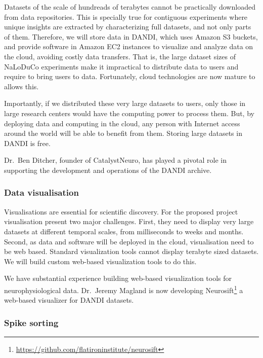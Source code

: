 Datasets of the scale of hundreads of terabytes cannot be practically
downloaded from data repositories. This is specially true for contiguous
experiments where unique insights are extracted by characterizing full
datasets, and not only parts of them.
%
Therefore, we will store data in DANDI, which uses Amazon S3 buckets, and
provide software in Amazon EC2 instances to visualize and analyze data on the
cloud, avoiding costly data transfers.
%
That is, the large dataset sizes of NaLoDuCo experiments make it impractical to
distribute data to users and require to bring users to data.
%
Fortunately, cloud technologies are now mature to allows this.

Importantly, if we distributed these very large datasets to users, only those
in large research centers would have the computing power to process them. But, by deploying data
and computing in the cloud, any person with Internet access around the world
will be able to benefit from them.
%
Storing large datasets in DANDI is free.

Dr.~Ben Ditcher, founder of CatalystNeuro, has played a pivotal role in
supporting the development and operations of the DANDI archive.

\subsubsection{Data visualisation}

Visualisations are essential for scientific discovery.
%
For the proposed project visualisation present two major challenges. First, they need
to display very large datasets at different temporal scales, from milliseconds
to weeks and months. Second, as data and software will be deployed in the
cloud, visualisation need to be web based.
%
Standard visualization tools cannot display terabyte sized datasets.
%
We will build custom web-based visualization tools to do this.

We have substantial experience building web-based visualization tools for
neurophysiological data. Dr.~Jeremy Magland is now developing
Neurosift\footnote{\url{https://github.com/flatironinstitute/neurosift}} a web-based
visualizer for DANDI datasets.

\subsubsection{Spike sorting}

